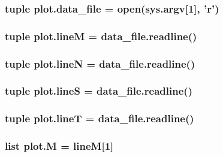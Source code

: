 \hypertarget{namespaceplot_a76604754d04d25d2ed09918540a6c70a}{
\subsubsection[{data\+\_\+file}]{\setlength{\rightskip}{0pt plus 5cm}tuple plot.\+data\+\_\+file = open(sys.\+argv\mbox{[}1\mbox{]}, 'r')}}\label{namespaceplot_a76604754d04d25d2ed09918540a6c70a}
\hypertarget{namespaceplot_a77186a44a4f6367fb7f0bb74ff404e18}{
\subsubsection[{line\+M}]{\setlength{\rightskip}{0pt plus 5cm}tuple plot.\+line\+M = data\+\_\+file.\+readline()}}\label{namespaceplot_a77186a44a4f6367fb7f0bb74ff404e18}
\hypertarget{namespaceplot_a36ffd57cec3771249d4084c61ddf66c5}{
\subsubsection[{line\+N}]{\setlength{\rightskip}{0pt plus 5cm}tuple plot.\+line\+N = data\+\_\+file.\+readline()}}\label{namespaceplot_a36ffd57cec3771249d4084c61ddf66c5}
\hypertarget{namespaceplot_a5ea77f461a65df196d3e8b9cb1f6907c}{
\subsubsection[{line\+S}]{\setlength{\rightskip}{0pt plus 5cm}tuple plot.\+line\+S = data\+\_\+file.\+readline()}}\label{namespaceplot_a5ea77f461a65df196d3e8b9cb1f6907c}
\hypertarget{namespaceplot_ac6d7b09f45c20812fc30774900d5a5ec}{
\subsubsection[{line\+T}]{\setlength{\rightskip}{0pt plus 5cm}tuple plot.\+line\+T = data\+\_\+file.\+readline()}}\label{namespaceplot_ac6d7b09f45c20812fc30774900d5a5ec}
\hypertarget{namespaceplot_a61ca36fd897e468faeff5efacb7c8982}{
\subsubsection[{M}]{\setlength{\rightskip}{0pt plus 5cm}list plot.\+M = {\bf line\+M}\mbox{[}1\mbox{]}}}\label{namespaceplot_a61ca36fd897e468faeff5efacb7c8982}
